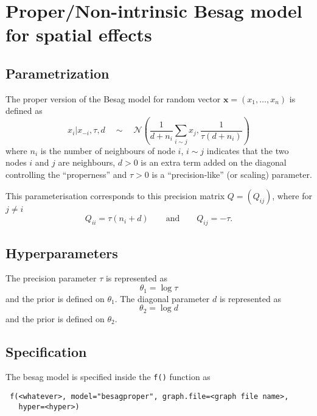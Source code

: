\documentclass[a4paper,11pt]{article}
\begin{document}
\section*{Proper/Non-intrinsic Besag model for spatial effects}

\subsection*{Parametrization}

The proper version of the Besag model for random vector
$\mathbf{x}=(x_1,\dots,x_n)$ is defined as
\begin{equation}\label{eq.besag}
    x_i|x_{-i},\tau,d\quad\sim\quad \mathcal{N}\left(\frac{1}{d+
          n_i}\sum_{i\sim j}x_j,\frac{1}{\tau(d + n_i)}\right)
\end{equation}
where $n_i$ is the number of neighbours of node $i$, $i\sim j$
indicates that the two nodes $i$ and $j$ are neighbours, $d > 0$ is an
extra term added on the diagonal controlling the ``properness'' and
$\tau > 0$ is a ``precision-like'' (or scaling) parameter.

This parameterisation corresponds to this precision matrix ${Q} =
(Q_{ij})$, where for $j\not=i$
\begin{displaymath}
    Q_{ii} = \tau(n_{i} + d) \qquad\text{and}\qquad Q_{ij} = -\tau.
\end{displaymath}


\subsection*{Hyperparameters}

The precision parameter $\tau$ is represented as
\begin{displaymath}
    \theta_{1} =\log \tau
\end{displaymath}
and the prior is defined on $\theta_{1}$. The diagonal parameter $d$ is
represented as
\begin{displaymath}
    \theta_{2} =\log d
\end{displaymath}
and the prior is defined on $\theta_{2}$. 

\subsection*{Specification}

The besag model is specified inside the {\tt f()} function as
\begin{verbatim}
 f(<whatever>, model="besagproper", graph.file=<graph file name>,
   hyper=<hyper>)
\end{verbatim}
\end{document}
